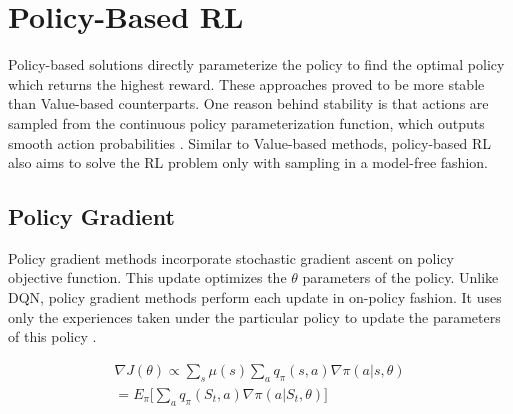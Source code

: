 \section{Policy-Based RL}

Policy-based solutions directly parameterize the policy to find the optimal policy which returns the highest reward. These approaches proved to be more stable than Value-based counterparts. One reason behind stability is that actions are sampled from the continuous policy parameterization function, which outputs smooth action probabilities \cite{Sutton2018}. Similar to Value-based methods, policy-based RL also aims to solve the RL problem only with sampling in a model-free fashion.

\subsection{Policy Gradient}

Policy gradient methods incorporate stochastic gradient ascent on policy objective function. This update optimizes the \(\theta\) parameters of the policy. Unlike DQN, policy gradient methods perform each update in on-policy fashion. It uses only the experiences taken under the particular policy to update the parameters of this policy \cite{SpinningUp2018}.

\begin{align}
    \nabla J(\theta) \propto \sum\limits_s \mu(s) \sum\limits_a q_{\pi}(s,a)\nabla \pi(a | s, \theta)\\
    = E_{\pi} \Big[\sum\limits_a q_{\pi}(S_t,a)\nabla\pi(a | S_t, \theta)\Big]
\end{align}
